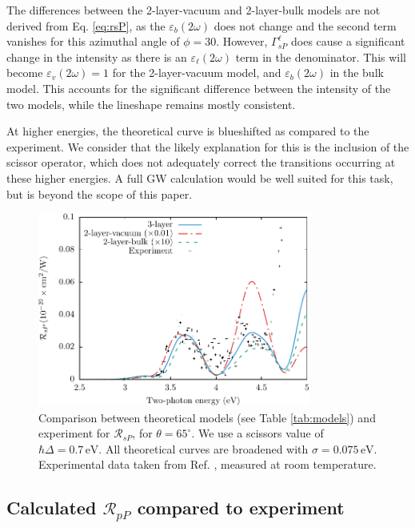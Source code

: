 \documentclass[11pt]{book}
\begin{document}
The differences between the 2-layer-vacuum and 2-layer-bulk models are not derived from Eq. \eqref{eq:rsP}, as the $\varepsilon_{b}(2\omega)$ does not change and the second term vanishes for this azimuthal angle of $\phi = 30$. However, $\Gamma^{\ell}_{sP}$ does cause a significant change in the intensity as there is an $\varepsilon_{\ell}(2\omega)$ term in the denominator. This will become $\varepsilon_{v}(2\omega) = 1$ for the 2-layer-vacuum model, and $\varepsilon_{b}(2\omega)$ in the bulk model. This accounts for the significant difference between the intensity of the two models, while the lineshape remains mostly consistent.

At higher energies, the theoretical curve is blueshifted as compared to the experiment. We consider that the likely explanation for this is the inclusion of the scissor operator, which does not adequately correct the transitions occurring at these higher energies. A full GW calculation would be well suited for this task, but is beyond the scope of this paper.

\begin{figure}
\centering
\includegraphics[width=0.8\textwidth]{../figures/04-results/fig-4_4_04}
\caption{Comparison between theoretical models (see Table
\ref{tab:models}) and experiment for $\mathcal{R}_{sP}$, for
$\theta=65^{\circ}$. We use a scissors value of $\hbar\Delta = 0.7\,\text{eV}$.
All theoretical curves are broadened with $\sigma=0.075\,\text{eV}$.
Experimental data taken from Ref. \cite{mejiaPRB02}, measured at room
temperature. \label{fig:RsP}}
\end{figure}



\subsection{Calculated \texorpdfstring{$\mathcal{R}_{pP}$}{RpP} compared to
experiment}\label{sec:RpP}
\end{document}
